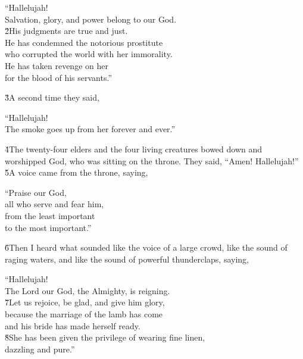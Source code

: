 \begin{poetry}
\poeml ``Hallelujah! \\
\poemll    Salvation, glory, and power belong to our God. \\
\poeml \v{2}His judgments are true and just. \\
\poemll    He has condemned the notorious prostitute \\
\poemlll       who corrupted the world with her immorality. \\
\poeml He has taken revenge on her \\
\poemll    for the blood of his servants.''
\end{poetry}

\v{3}A second time they said,

\begin{poetry}
\poeml ``Hallelujah! \\
\poemll    The smoke goes up from her forever and ever.''
\end{poetry}

\v{4}The twenty-four elders and the four living creatures bowed down and worshipped God, who was sitting on the throne. They said, ``Amen! Hallelujah!'' \v{5}A voice came from the throne, saying,

\begin{poetry}
\poeml ``Praise our God, \\
\poemll    all who serve and fear him, \\
\poeml from the least important \\
\poemll    to the most important.''
\end{poetry}

\v{6}Then I heard what sounded like the voice of a large crowd, like the sound of raging waters, and like the sound of powerful thunderclaps, saying,

\begin{poetry}
\poeml ``Hallelujah! \\
\poemll    The Lord our God, the Almighty, is reigning. \\
\poeml \v{7}Let us rejoice, be glad, and give him glory, \\
\poemll    because the marriage of the lamb has come \\
\poemlll       and his bride has made herself ready. \\
\poeml \v{8}She has been given the privilege of wearing fine linen, \\
\poemll    dazzling and pure.''
\end{poetry}

